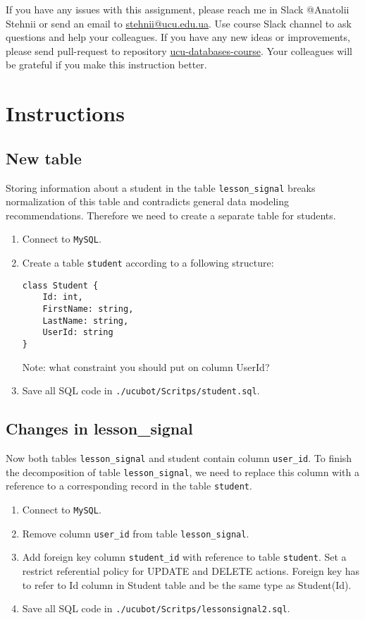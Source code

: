 \documentclass[12pt]{article}
\newcommand{\code}[1]{\texttt{#1}}
\begin{document}
If you have any issues with this assignment, please reach me in Slack @Anatolii Stehnii or send an email to \href{mailto:stehnii@ucu.edu.ua}{stehnii@ucu.edu.ua}. Use course Slack channel to ask questions and help your colleagues. If you have any new ideas or improvements, please send pull-request to repository \href{https://github.com/tsdaemon/ucu-databases-course}{ucu-databases-course}. Your colleagues will be grateful if you make this instruction better.

\section*{Instructions}

\subsection*{New table}

Storing information about a student in the table \code{lesson\_signal} breaks normalization of this table and contradicts general data modeling recommendations. Therefore we need to create a separate table for students.

\begin{enumerate}
\item Connect to \code{MySQL}.
\item Create a table \code{student} according to a following structure:
\begin{verbatim}
class Student {
    Id: int,
    FirstName: string,
    LastName: string,
    UserId: string
}
\end{verbatim}
Note: what constraint you should put on column UserId?
\item Save all SQL code in \break \code{./ucubot/Scritps/student.sql}.
\end{enumerate}

\subsection*{Changes in lesson\_signal}

Now both tables \code{lesson\_signal} and {student} contain column \code{user\_id}. To finish the decomposition of table \code{lesson\_signal}, we need to replace this column with a reference to a corresponding record in the table \code{student}.

\begin{enumerate}

\item Connect to \code{MySQL}.
\item Remove column \code{user\_id} from table \code{lesson\_signal}.
\item Add foreign key column \code{student\_id} with reference to table \code{student}. Set a restrict referential policy for UPDATE and DELETE actions. Foreign key has to refer to Id column in Student table and be the same type as Student(Id).
\item Save all SQL code in \break \code{./ucubot/Scritps/lesson\-signal2.sql}.

\end{enumerate}
\end{document}
